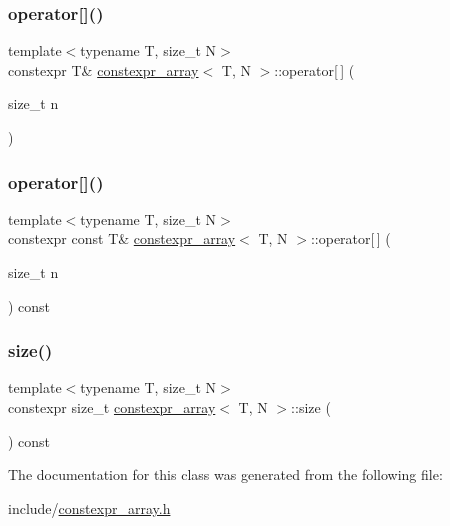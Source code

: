 \mbox{\label{classconstexpr__array_a361c0575453f2ae3a363dbd35cd94a8e}} 
\subsubsection{\texorpdfstring{operator[]()}{operator[]()}\hspace{0.1cm}{\footnotesize\ttfamily [1/2]}}
{\footnotesize\ttfamily template$<$typename T, size\+\_\+t N$>$ \\
constexpr T\& \hyperlink{classconstexpr__array}{constexpr\+\_\+array}$<$ T, N $>$\+::operator\mbox{[}$\,$\mbox{]} (\begin{DoxyParamCaption}\item[{size\+\_\+t}]{n }\end{DoxyParamCaption})\hspace{0.3cm}{\ttfamily [inline]}}

\mbox{\label{classconstexpr__array_af4dbc25da16e0e08bedb1d37693eda34}} 
\subsubsection{\texorpdfstring{operator[]()}{operator[]()}\hspace{0.1cm}{\footnotesize\ttfamily [2/2]}}
{\footnotesize\ttfamily template$<$typename T, size\+\_\+t N$>$ \\
constexpr const T\& \hyperlink{classconstexpr__array}{constexpr\+\_\+array}$<$ T, N $>$\+::operator\mbox{[}$\,$\mbox{]} (\begin{DoxyParamCaption}\item[{size\+\_\+t}]{n }\end{DoxyParamCaption}) const\hspace{0.3cm}{\ttfamily [inline]}}

\mbox{\label{classconstexpr__array_ae6cbbf0ef54c3df192c861572e4a2d5d}} 
\subsubsection{\texorpdfstring{size()}{size()}}
{\footnotesize\ttfamily template$<$typename T, size\+\_\+t N$>$ \\
constexpr size\+\_\+t \hyperlink{classconstexpr__array}{constexpr\+\_\+array}$<$ T, N $>$\+::size (\begin{DoxyParamCaption}{ }\end{DoxyParamCaption}) const\hspace{0.3cm}{\ttfamily [inline]}}



The documentation for this class was generated from the following file\+:\begin{DoxyCompactItemize}
\item 
include/\hyperlink{constexpr__array_8h}{constexpr\+\_\+array.\+h}\end{DoxyCompactItemize}
